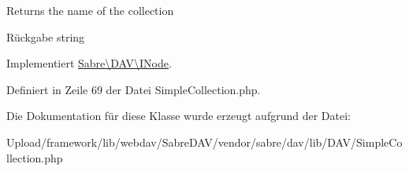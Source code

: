 Returns the name of the collection

\begin{DoxyReturn}{Rückgabe}
string 
\end{DoxyReturn}


Implementiert \mbox{\hyperlink{interface_sabre_1_1_d_a_v_1_1_i_node_ab616fe836b1ae36af12126a2bc934dce}{Sabre\textbackslash{}\+D\+A\+V\textbackslash{}\+I\+Node}}.



Definiert in Zeile 69 der Datei Simple\+Collection.\+php.



Die Dokumentation für diese Klasse wurde erzeugt aufgrund der Datei\+:\begin{DoxyCompactItemize}
\item 
Upload/framework/lib/webdav/\+Sabre\+D\+A\+V/vendor/sabre/dav/lib/\+D\+A\+V/Simple\+Collection.\+php\end{DoxyCompactItemize}
